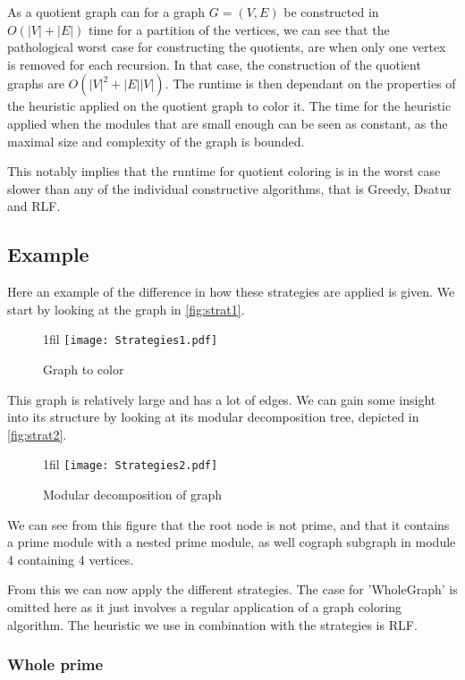 \documentclass[a4paper]{article}
\makeatletter
\newcommand*{\centerfloat}{%
  \parindent \z@
  \leftskip \z@ \@plus 1fil \@minus \textwidth
  \rightskip\leftskip
  \parfillskip \z@skip}
\makeatother
\begin{document}
As a quotient graph can for a graph $G = (V,E)$ be constructed in
$O(|V|+|E|)$ time for a partition of the vertices, we can see that the pathological
worst case for constructing the quotients, are when only one vertex is removed
for each recursion. In that case, the construction of the quotient graphs are
$O(|V|^2+|E||V|)$. The runtime is then dependant on the properties of the
heuristic applied on the quotient graph to color it. The time for the heuristic
applied when the modules that are small enough can be seen as constant, as the
maximal size and complexity of the graph is bounded. 

This notably implies that the runtime for quotient coloring is in the worst 
case slower than any of the individual constructive algorithms, that is 
Greedy, Dsatur and RLF.


\subsection{Example}
\label{sec:stratexample}
Here an example of the difference in how these strategies are applied is given.
We start by looking at the graph in \autoref{fig:strat1}.

\begin{figure}[H]
    \centerfloat
    \texttt{[image: Strategies1.pdf]}
    \caption{Graph to color}
    \label{fig:strat1}
\end{figure}

This graph is relatively large and has a lot of edges. 
We can gain some insight into its structure by looking at its modular decomposition tree,
depicted in \autoref{fig:strat2}.

\begin{figure}[H]
    \centerfloat
    \texttt{[image: Strategies2.pdf]}
    \caption{Modular decomposition of graph}
    \label{fig:strat2}
\end{figure}

We can see from this figure that the root node is not prime, and that it contains a
prime module with a nested prime module, as well cograph
subgraph in module 4 containing 4 vertices.

From this we can now apply the different strategies. The case for 'WholeGraph'
is omitted here as it just involves a regular application of a graph coloring
algorithm. The heuristic we use in combination with the strategies is RLF. 

\subsubsection{Whole prime}
\end{document}
